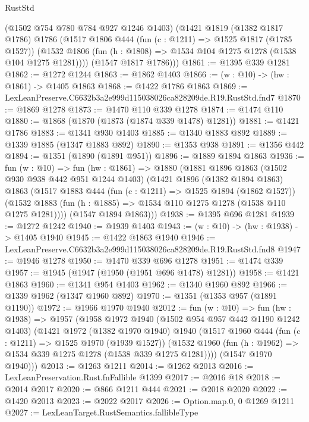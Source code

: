 \begin{lexlean}{RustStd}
\begin{coremodule}
      (@1502 @754 @780 @784 @927 @1246 @1403)
      (@1421
        @1819
        (@1382 @1817 @1786)
        @1786
        (@1517
          @1806
          @444
          (fun (c : @1211) => @1525 @1817 (@1785 @1527))
          (@1532 @1806 (fun (h : @1808) => @1534 @104 @1275 @1278 (@1538 @104 @1275 @1281))))
        (@1547 @1817 @1786)))
@1861 := @1395 @339 @1281
@1862 := @1272 @1244
@1863 := @1862 @1403
@1866 := (w : @10) -> (hw : @1861) -> @1405 @1863
@1868 := @1422 @1786 @1863
@1869 := LexLeanPreserve.C6632b3a2e999d115038026ca828209de.R19.RustStd.fnd7
@1870 := @1869 @1278
@1873 := @1470 @110 @339 @1278
@1874 := @1474 @110
@1880 := @1868 (@1870 (@1873 (@1874 @339 @1478) @1281))
@1881 := @1421 @1786
@1883 := @1341 @930 @1403
@1885 := @1340 @1883 @892
@1889 := @1339 @1885 (@1347 @1883 @892)
@1890 := @1353 @938
@1891 := @1356 @442
@1894 := @1351 (@1890 (@1891 @951))
@1896 := @1889 @1894 @1863
@1936 := fun (w : @10) =>
  fun (hw : @1861) =>
  @1880
    (@1881
      @1896
      @1863
      (@1502 @930 @938 @442 @951 @1244 @1403)
      (@1421
        @1896
        (@1382 @1894 @1863)
        @1863
        (@1517
          @1883
          @444
          (fun (c : @1211) => @1525 @1894 (@1862 @1527))
          (@1532 @1883 (fun (h : @1885) => @1534 @110 @1275 @1278 (@1538 @110 @1275 @1281))))
        (@1547 @1894 @1863)))
@1938 := @1395 @696 @1281
@1939 := @1272 @1242
@1940 := @1939 @1403
@1943 := (w : @10) -> (hw : @1938) -> @1405 @1940
@1945 := @1422 @1863 @1940
@1946 := LexLeanPreserve.C6632b3a2e999d115038026ca828209de.R19.RustStd.fnd8
@1947 := @1946 @1278
@1950 := @1470 @339 @696 @1278
@1951 := @1474 @339
@1957 := @1945 (@1947 (@1950 (@1951 @696 @1478) @1281))
@1958 := @1421 @1863
@1960 := @1341 @954 @1403
@1962 := @1340 @1960 @892
@1966 := @1339 @1962 (@1347 @1960 @892)
@1970 := @1351 (@1353 @957 (@1891 @1190))
@1972 := @1966 @1970 @1940
@2012 := fun (w : @10) =>
  fun (hw : @1938) =>
  @1957
    (@1958
      @1972
      @1940
      (@1502 @954 @957 @442 @1190 @1242 @1403)
      (@1421
        @1972
        (@1382 @1970 @1940)
        @1940
        (@1517
          @1960
          @444
          (fun (c : @1211) => @1525 @1970 (@1939 @1527))
          (@1532 @1960 (fun (h : @1962) => @1534 @339 @1275 @1278 (@1538 @339 @1275 @1281))))
        (@1547 @1970 @1940)))
@2013 := @1263 @1211
@2014 := @1262 @2013
@2016 := LexLeanPreservation.Rust.fnFallible @1399
@2017 := @2016 @18
@2018 := @2014 @2017
@2020 := @866 @1211 @444
@2021 := @2018 @2020
@2022 := @1420 @2013
@2023 := @2022 @2017
@2026 := Option.map.{0, 0} @1269 @1211
@2027 := LexLeanTarget.RustSemantics.fallibleType

\end{coremodule}
\end{lexlean}
